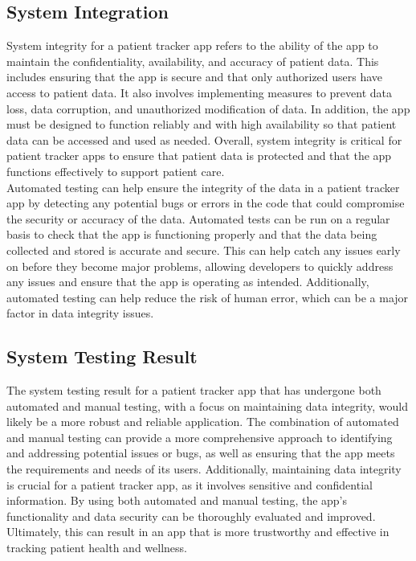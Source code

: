 \documentclass[12pt]{article}
\begin{document}
			\subsection{System Integration}
			\quad System integrity for a patient tracker app refers to the ability of the app to maintain the confidentiality, availability, and accuracy of patient data. This includes ensuring that the app is secure and that only authorized users have access to patient data. It also involves implementing measures to prevent data loss, data corruption, and unauthorized modification of data. In addition, the app must be designed to function reliably and with high availability so that patient data can be accessed and used as needed. Overall, system integrity is critical for patient tracker apps to ensure that patient data is protected and that the app functions effectively to support patient care.\\
			
			\quad Automated testing can help ensure the integrity of the data in a patient tracker app by detecting any potential bugs or errors in the code that could compromise the security or accuracy of the data. Automated tests can be run on a regular basis to check that the app is functioning properly and that the data being collected and stored is accurate and secure. This can help catch any issues early on before they become major problems, allowing developers to quickly address any issues and ensure that the app is operating as intended. Additionally, automated testing can help reduce the risk of human error, which can be a major factor in data integrity issues.
			\subsection{System Testing Result}
			
			\quad The system testing result for a patient tracker app that has undergone both automated and manual testing, with a focus on maintaining data integrity, would likely be a more robust and reliable application. The combination of automated and manual testing can provide a more comprehensive approach to identifying and addressing potential issues or bugs, as well as ensuring that the app meets the requirements and needs of its users. Additionally, maintaining data integrity is crucial for a patient tracker app, as it involves sensitive and confidential information. By using both automated and manual testing, the app's functionality and data security can be thoroughly evaluated and improved. Ultimately, this can result in an app that is more trustworthy and effective in tracking patient health and wellness.
			\newpage
			
\end{document}
